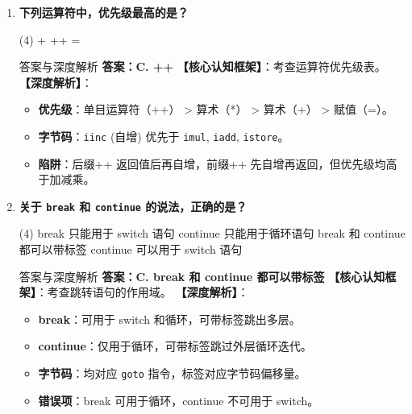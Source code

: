 \documentclass[12pt, a4paper]{ctexart}
\newcommand{\code}[1]{\texttt{#1}}
\begin{document}
\begin{enumerate}[label=\textbf{\arabic*.}, leftmargin=*, itemsep=1.5em]
\item \textbf{下列运算符中，优先级最高的是？}
\begin{tasks}(4)
    \task + \task * \task ++ \task =
\end{tasks}
\begin{bluebox}{答案与深度解析}
\textbf{答案：C. ++}
\textbf{【核心认知框架】}：考查运算符优先级表。
\textbf{【深度解析】}：
\begin{itemize}[leftmargin=*, nosep]
    \item \textbf{优先级}：单目运算符（++） > 算术（*） > 算术（+） > 赋值（=）。
    \item \textbf{字节码}：\code{iinc} (自增) 优先于 \code{imul}, \code{iadd}, \code{istore}。
    \item \textbf{陷阱}：后缀++ 返回值后再自增，前缀++ 先自增再返回，但优先级均高于加减乘。
\end{itemize}
\end{bluebox}

\item \textbf{关于 \code{break} 和 \code{continue} 的说法，正确的是？}
\begin{tasks}(4)
    \task break 只能用于 switch 语句 \task continue 只能用于循环语句
    \task break 和 continue 都可以带标签 \task continue 可以用于 switch 语句
\end{tasks}
\begin{bluebox}{答案与深度解析}
\textbf{答案：C. break 和 continue 都可以带标签}
\textbf{【核心认知框架】}：考查跳转语句的作用域。
\textbf{【深度解析】}：
\begin{itemize}[leftmargin=*, nosep]
    \item \textbf{break}：可用于 switch 和循环，可带标签跳出多层。
    \item \textbf{continue}：仅用于循环，可带标签跳过外层循环迭代。
    \item \textbf{字节码}：均对应 \code{goto} 指令，标签对应字节码偏移量。
    \item \textbf{错误项}：break 可用于循环，continue 不可用于 switch。
\end{itemize}
\end{bluebox}


\end{enumerate}
\end{document}
